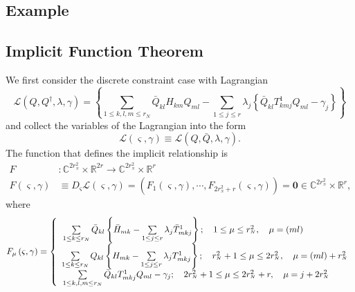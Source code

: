 \documentclass[aps,preprint]{revtex4}%
\begin{document}
\subsection{Example}

\subsection{Implicit Function Theorem}

We first consider the discrete constraint case with Lagrangian
\begin{equation}
\mathcal{L}\left(  Q,Q^{\dagger},\lambda,\gamma\right)  =\left\{  \sum_{1\leq
k,l,m\leq r_{N}}\bar{Q}_{kl}H_{km}Q_{ml}-\sum_{1\leq j\leq r}\lambda
_{j}\left\{  \bar{Q}_{kl}T_{kmj}^{1}Q_{ml}-\gamma_{j}\right\}  \right\}
\end{equation}
and collect the variables of the Lagrangian into the form
\begin{equation}
\mathcal{L}\left(  \varsigma,\gamma\right)  \equiv\mathcal{L}\left(  Q,\bar
{Q},\lambda,\gamma\right)  .
\end{equation}
The function that defines the implicit relationship is
\begin{align}
F  &  :\mathbb{C}^{2r_{^{N}}^{2}}\times\mathbb{R}^{2r}\rightarrow
\mathbb{C}^{2r_{^{N}}^{2}}\times\mathbb{R}^{r}\nonumber\\
F\left(  \varsigma,\gamma\right)   &  \equiv D_{\varsigma}\mathcal{L}\left(
\varsigma,\gamma\right)  =\left(  F_{1}\left(  \varsigma,\gamma\right)
,\cdots,F_{2r_{^{N}}^{2}+r}\left(  \varsigma,\gamma\right)  \right)
=\mathbf{0\in}\mathbb{C}^{2r_{^{N}}^{2}}\times\mathbb{R}^{r},
\end{align}
where
\begin{equation}
F_{\mu}\left(  \varsigma,\gamma\right)  =\left\{
\begin{array}
[c]{c}%
\sum\limits_{1\leq k\leq r_{N}}\bar{Q}_{kl}\left\{  \bar{H}_{mk}%
-\sum\limits_{1\leq j\leq r}\lambda_{j}\bar{T}_{mkj}^{1}\right\}  ;\quad
1\leq\mu\leq r_{^{N}}^{2},\quad\mu=\left(  ml\right)  \qquad\qquad\quad\\
\sum\limits_{1\leq k\leq r_{N}}Q_{kl}\left\{  H_{mk}-\sum\limits_{1\leq j\leq
r}\lambda_{j}T_{mkj}^{1}\right\}  ;\quad r_{^{N}}^{2}+1\leq\mu\leq2r_{^{N}%
}^{2},\quad\mu=\left(  ml\right)  +r_{^{N}}^{2}\\
\sum\limits_{1\leq k,l,m\leq r_{N}}\bar{Q}_{kl}T_{mkj}^{1}Q_{ml}-\gamma
_{j};\quad2r_{^{N}}^{2}+1\leq\mu\leq2r_{^{N}}^{2}+r,\quad\mu=j+2r_{^{N}}%
^{2}\quad\quad
\end{array}
\right.
\end{equation}
\end{document}
